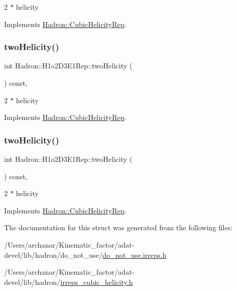 2 $\ast$ helicity 

Implements \mbox{\hyperlink{structHadron_1_1CubicHelicityRep_af507aa56fc2747eacc8cb6c96db31ecc}{Hadron\+::\+Cubic\+Helicity\+Rep}}.

\mbox{\label{structHadron_1_1H1o2D3E1Rep_ad799181c4402996e554f19711fdf3375}} 
\subsubsection{\texorpdfstring{twoHelicity()}{twoHelicity()}\hspace{0.1cm}{\footnotesize\ttfamily [2/3]}}
{\footnotesize\ttfamily int Hadron\+::\+H1o2\+D3\+E1\+Rep\+::two\+Helicity (\begin{DoxyParamCaption}{ }\end{DoxyParamCaption}) const\hspace{0.3cm}{\ttfamily [inline]}, {\ttfamily [virtual]}}

2 $\ast$ helicity 

Implements \mbox{\hyperlink{structHadron_1_1CubicHelicityRep_af507aa56fc2747eacc8cb6c96db31ecc}{Hadron\+::\+Cubic\+Helicity\+Rep}}.

\mbox{\label{structHadron_1_1H1o2D3E1Rep_ad799181c4402996e554f19711fdf3375}} 
\subsubsection{\texorpdfstring{twoHelicity()}{twoHelicity()}\hspace{0.1cm}{\footnotesize\ttfamily [3/3]}}
{\footnotesize\ttfamily int Hadron\+::\+H1o2\+D3\+E1\+Rep\+::two\+Helicity (\begin{DoxyParamCaption}{ }\end{DoxyParamCaption}) const\hspace{0.3cm}{\ttfamily [inline]}, {\ttfamily [virtual]}}

2 $\ast$ helicity 

Implements \mbox{\hyperlink{structHadron_1_1CubicHelicityRep_af507aa56fc2747eacc8cb6c96db31ecc}{Hadron\+::\+Cubic\+Helicity\+Rep}}.



The documentation for this struct was generated from the following files\+:\begin{DoxyCompactItemize}
\item 
/\+Users/archanar/\+Kinematic\+\_\+factor/adat-\/devel/lib/hadron/do\+\_\+not\+\_\+use/\mbox{\hyperlink{adat-devel_2lib_2hadron_2do__not__use_2do__not__use_8irreps_8h}{do\+\_\+not\+\_\+use.\+irreps.\+h}}\item 
/\+Users/archanar/\+Kinematic\+\_\+factor/adat-\/devel/lib/hadron/\mbox{\hyperlink{adat-devel_2lib_2hadron_2irreps__cubic__helicity_8h}{irreps\+\_\+cubic\+\_\+helicity.\+h}}\end{DoxyCompactItemize}
